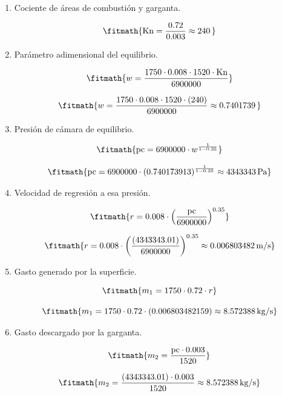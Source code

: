 \begin{enumerate}

\item Cociente de áreas de combustión y garganta.

\[\fitmath{\mathrm{Kn}=\frac{0.72}{0.003}\approx 240\,}\]

\item Parámetro adimensional del equilibrio.

\[\fitmath{w=\frac{1750\cdot 0.008\cdot 1520\cdot \mathrm{Kn}}{6900000}}\]

\[\fitmath{w=\frac{1750\cdot 0.008\cdot 1520\cdot (240)}{6900000}\approx 0.7401739\,}\]

\item Presión de cámara de equilibrio.

\[\fitmath{\mathrm{pc}=6900000\cdot {w}^{\frac{1}{1-0.35}}}\]

\[\fitmath{\mathrm{pc}=6900000\cdot {(0.740173913)}^{\frac{1}{1-0.35}}\approx 4343343\,\mathrm{Pa}}\]

\item Velocidad de regresión a esa presión.

\[\fitmath{r=0.008\cdot {\left(\frac{\mathrm{pc}}{6900000}\right)}^{0.35}}\]

\[\fitmath{r=0.008\cdot {\left(\frac{(4343343.01)}{6900000}\right)}^{0.35}\approx 0.006803482\,\mathrm{m/s}}\]

\item Gasto generado por la superficie.

\[\fitmath{m_{1}=1750\cdot 0.72\cdot r}\]

\[\fitmath{m_{1}=1750\cdot 0.72\cdot (0.006803482159)\approx 8.572388\,\mathrm{kg/s}}\]

\item Gasto descargado por la garganta.

\[\fitmath{m_{2}=\frac{\mathrm{pc}\cdot 0.003}{1520}}\]

\[\fitmath{m_{2}=\frac{(4343343.01)\cdot 0.003}{1520}\approx 8.572388\,\mathrm{kg/s}}\]

\end{enumerate}
